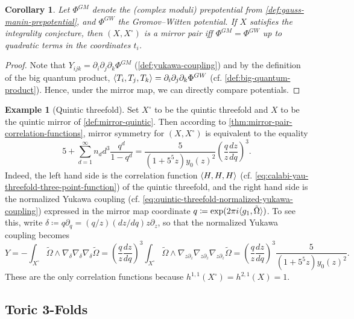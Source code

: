 \documentclass{report}
\theoremstyle{plain}
\newtheorem{corollary}[theorem]{Corollary}
\theoremstyle{definition}
\newtheorem{example}[theorem]{Example}
\theoremstyle{remark}
\newcommand{\di}{\partial}
\DeclarePairedDelimiter{\inner}{\langle}{\rangle}
\begin{document}
\begin{corollary}
  Let $\Phi^{GM}$ denote the (complex moduli) prepotential from
  \ref{def:gauss-manin-prepotential}, and $\Phi^{GW}$ the
  Gromov--Witten potential. If $X$ satisfies the integrality
  conjecture, then $(X, X^\circ)$ is a mirror pair iff $\Phi^{GM} =
  \Phi^{GW}$ up to quadratic terms in the coordinates $t_i$.
\end{corollary}

\begin{proof}
  Note that $Y_{ijk} = \di_i \di_j \di_k \Phi^{GM}$
  (\ref{def:yukawa-coupling}) and by the definition of the big quantum
  product, $\inner{T_i,T_j,T_k} = \di_i \di_j \di_k \Phi^{GW}$ (cf.
  \ref{def:big-quantum-product}). Hence, under the mirror map, we can
  directly compare potentials.
\end{proof}

\begin{example}[Quintic threefold]
  Set $X^\circ$ to be the quintic threefold and $X$ to be the
  quintic mirror of \ref{def:mirror-quintic}. Then according to
  \ref{thm:mirror-pair-correlation-functions}, mirror symmetry for
  $(X, X^\circ)$ is equivalent to the equality
  \[ 5 + \sum_{d=1}^\infty n_d d^3 \frac{q^d}{1 - q^d} = \frac{5}{(1 + 5^5z) y_0(z)^2} \left(\frac{q}{z} \frac{dz}{dq}\right)^3. \]
  Indeed, the left hand side is the correlation function
  $\inner{H,H,H}$ (cf.
  \eqref{eq:calabi-yau-threefold-three-point-function}) of the quintic
  threefold, and the right hand side is the normalized Yukawa coupling
  (cf. \eqref{eq:quintic-threefold-normalized-yukawa-coupling})
  expressed in the mirror map coordinate $q \coloneqq \exp(2\pi i
  \inner{g_1, \tilde\Omega})$. To see this, write $\delta \coloneqq q
  \di_q = (q/z) (dz/dq) z \di_z$, so that the normalized
  Yukawa coupling becomes
  \[ Y = -\int_{X^\circ} \tilde\Omega \wedge \nabla_\delta \nabla_\delta \nabla_\delta \tilde\Omega = \left(\frac{q}{z} \frac{dz}{dq}\right)^3 \int_{X^\circ} \tilde\Omega \wedge \nabla_{z\di_z} \nabla_{z \di_z} \nabla_{z \di_z} \tilde\Omega = \left(\frac{q}{z} \frac{dz}{dq}\right)^3 \frac{5}{(1 + 5^5z) y_0(z)^2}. \]
  These are the only correlation functions because $h^{1,1}(X^\circ) =
  h^{2,1}(X) = 1$.
\end{example}

\subsection{Toric 3-Folds}

\end{document}
